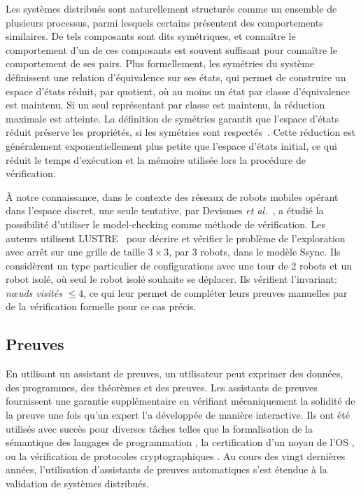 Les systèmes distribués sont naturellement structurés comme un
ensemble de plusieurs processus, parmi lesquels certains présentent
des comportements similaires. De tels composants sont dits
symétriques, et connaître le comportement d'un de ces composants est
souvent suffisant pour connaître le comportement de ses pairs. Plus
formellement, les symétries du système définissent une relation
d'équivalence sur ses états, qui permet de construire un espace
d'états réduit, par quotient, où au moins un état par classe
d'équivalence est maintenu.  Si un seul représentant par classe est
maintenu, la réduction maximale est atteinte. La définition de
symétries garantit que l'espace d'états réduit préserve les
propriétés, si les symétries sont respectés~\cite{ClarkeJEF96,
  EmersonS96}. Cette réduction est généralement exponentiellement plus
petite que l'espace d'états initial, ce qui réduit le temps
d'exécution et la mémoire utilisée lors la procédure de vérification.

À notre connaissance, dans le contexte des réseaux de robots mobiles
opérant dans l'espace discret, une seule tentative, par Devismes
\emph{et al.}~\cite{devismes_optimal_2011}, a étudié la possibilité
d'utiliser le model-checking comme méthode de vérification. Les auteurs
utilisent LUSTRE~\cite{lustre:ieee} pour décrire et vérifier le
problème de l'exploration avec arrêt sur une grille de taille $ 3
\times 3 $, par $3$ robots, dans le modèle Ssync.  Ils considèrent un
type particulier de configurations avec une tour de 2 robots et un
robot isolé, où seul le robot isolé souhaite se déplacer.  Ils
vérifient l'invariant: \emph{nœuds visités} $\leq 4 $, ce qui leur
permet de compléter leurs preuves manuelles par de la vérification
formelle pour ce cas précis.
	
\subsection{Preuves}
En utilisant un assistant de preuves, un utilisateur peut exprimer des
données, des programmes, des théorèmes et des preuves.  Les assistants
de preuves fournissent une garantie supplémentaire en vérifiant
mécaniquement la solidité de la preuve une fois qu'un expert l'a
développée de manière interactive.  Ils ont été utilisés avec succès
pour diverses tâches telles que la formalisation de la sémantique des
langages de programmation \cite{Leroy09}, la certification d'un noyau
de l'OS \cite{KleinAEHCDEEKNSTW10}, ou la vérification de protocoles
cryptographiques \cite{AlmeidaBBBKB12}.  Au cours des vingt dernières
années, l'utilisation d'assistants de preuves automatiques s'est
étendue à la validation de systèmes distribués.

